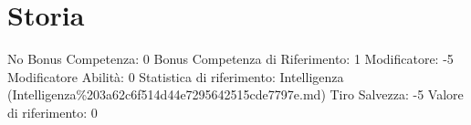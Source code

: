 \section{Storia}\label{storia}

\begin{description}
\tightlist
\item[Tags: ABI]
No Bonus Competenza: 0 Bonus Competenza di Riferimento: 1 Modificatore:
-5 Modificatore Abilità: 0 Statistica di riferimento: Intelligenza
(Intelligenza\%203a62c6f514d44e7295642515cde7797e.md) Tiro Salvezza: -5
Valore di riferimento: 0
\end{description}
